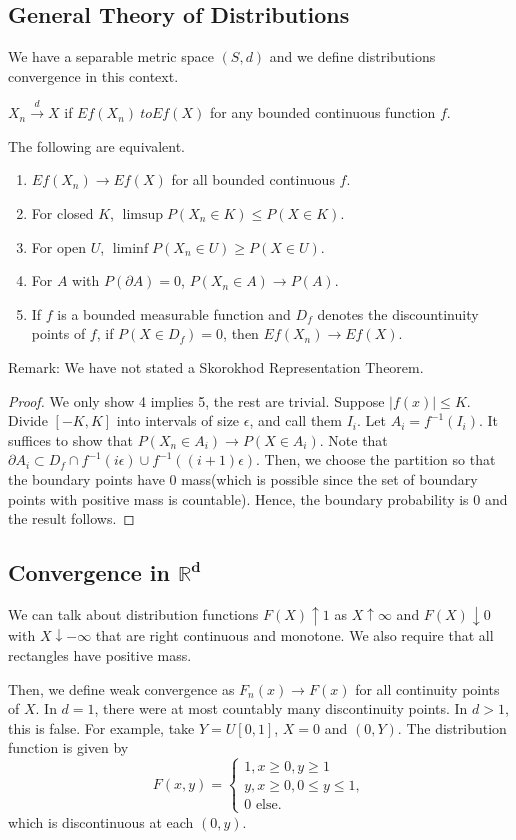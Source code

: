 \documentclass[11pt]{scrartcl}
\newcommand{\R}{\mathbb{R}}
\begin{document}
\subsection{General Theory of Distributions}
We have a separable metric space $(S, d)$ and we define distributions convergence in this context.  
\begin{definition} $X_n \xrightarrow{d} X$ if $Ef(X_n)\ to Ef(X)$ for any bounded continuous function $f$.
\end{definition}
\begin{thm} The following are equivalent.
\begin{enumerate}
\item $Ef(X_n) \to Ef(X)$ for all bounded continuous $f$.
\item For closed $K$, $\limsup P(X_n \in K) \le P(X \in K)$.
\item For open $U$, $\liminf P(X_n \in U) \ge P(X \in U)$.
\item For $A$ with $P(\partial A) = 0$, $P(X_n \in A) \to P(A)$.
\item If $f$ is a bounded measurable function and $D_f$ denotes the discountinuity points of $f$, if $P(X \in D_f) = 0$, then $Ef(X_n) \to Ef(X).$
\end{enumerate}
\end{thm}
Remark: We have not stated a Skorokhod Representation Theorem. 
\begin{proof}
We only show 4 implies 5, the rest are trivial.  Suppose $|f(x)| \le K$.  Divide $[-K, K]$ into intervals of size $\epsilon$, and call them $I_i$.  Let $A_i = f^{-1}(I_i)$.  It suffices to show that $P(X_n \in A_i) \to P(X \in A_i)$.  Note that $\partial A_i \subset D_f \cap f^{-1}(i\epsilon) \cup f^{-1}((i+1)\epsilon)$.  Then, we choose the partition so that the boundary points have $0$ mass(which is possible since the set of boundary points with positive mass is countable).  Hence, the boundary probability is $0$ and the result follows.
\end{proof}
\subsection{Convergence in $\mathbf{\R^d}$}
We can talk about distribution functions $F(X) \uparrow 1$ as $X \uparrow \infty$ and $F(X) \downarrow 0$ with $X \downarrow -\infty$ that are right continuous and monotone.  We also require that all rectangles have positive mass.  

Then, we define weak convergence as $F_n(x) \to F(x)$ for all continuity points of $X$.  In $d=1$, there were at most countably many discontinuity points.  In $d > 1$, this is false.  For example, take $Y = U[0, 1]$, $X= 0$ and $(0, Y)$.  The distribution function is given by 
$$F(x, y) = \begin{cases} 1, x \ge 0, y \ge 1 \\ y, x \ge 0, 0 \le y \le 1,\\ 0 \text{ else}.
\end{cases}$$
which is discontinuous at each $(0, y)$.
\end{document}
